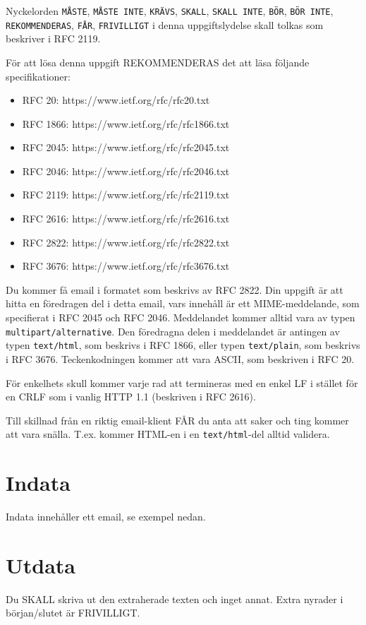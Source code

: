 
Nyckelorden \texttt{MÅSTE}, \texttt{MÅSTE INTE}, \texttt{KRÄVS}, \texttt{SKALL}, \texttt{SKALL INTE}, \texttt{BÖR}, \texttt{BÖR INTE}, \texttt{REKOMMENDERAS}, \texttt{FÅR}, \texttt{FRIVILLIGT} i denna uppgiftslydelse skall tolkas som beskriver i RFC 2119.

För att lösa denna uppgift REKOMMENDERAS det att läsa följande specifikationer:
\begin{itemize}
	\item RFC 20: https://www.ietf.org/rfc/rfc20.txt
	\item RFC 1866: https://www.ietf.org/rfc/rfc1866.txt
	\item RFC 2045: https://www.ietf.org/rfc/rfc2045.txt
	\item RFC 2046: https://www.ietf.org/rfc/rfc2046.txt
	\item RFC 2119: https://www.ietf.org/rfc/rfc2119.txt
	\item RFC 2616: https://www.ietf.org/rfc/rfc2616.txt
	\item RFC 2822: https://www.ietf.org/rfc/rfc2822.txt
	\item RFC 3676: https://www.ietf.org/rfc/rfc3676.txt
\end{itemize}

Du kommer få email i formatet som beskrivs av RFC 2822.  Din uppgift är att hitta en föredragen del i detta email, vars innehåll är ett MIME-meddelande, som specifierat i RFC 2045 och RFC 2046. Meddelandet kommer alltid vara av typen \texttt{multipart/alternative}. Den föredragna delen i meddelandet är antingen av typen \texttt{text/html}, som beskrivs i RFC 1866, eller typen \texttt{text/plain}, som beskrivs i RFC 3676. Teckenkodningen kommer att vara ASCII, som beskriven i RFC 20.


För enkelhets skull kommer varje rad att termineras med en enkel LF i stället för en CRLF som i vanlig HTTP 1.1 (beskriven i RFC 2616).

Till skillnad från en riktig email-klient FÅR du anta att saker och ting kommer att vara snälla. T.ex. kommer HTML-en i en \texttt{text/html}-del alltid validera.

\section*{Indata}
Indata innehåller ett email, se exempel nedan.

\section*{Utdata}
Du SKALL skriva ut den extraherade texten och inget annat. Extra nyrader i början/slutet är FRIVILLIGT.

